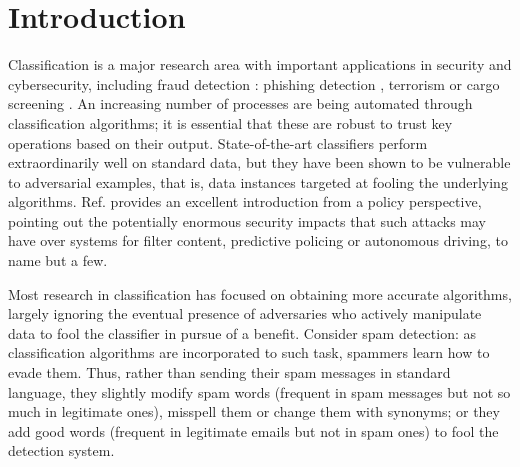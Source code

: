 
\section{Introduction}



Classification is a major research area with important applications  in security and cybersecurity, including fraud detection \cite{bolton2002statistical}: phishing detection \cite{rakesh}, terrorism \cite{terror} or cargo screening \cite{cargo}. An increasing number of processes are being automated through classification algorithms; it is essential that these are robust to trust key operations based on their output. State-of-the-art classifiers perform extraordinarily well on standard data, but they have been shown to be vulnerable to adversarial examples, that is, data instances targeted at fooling the underlying algorithms. Ref. \cite{comiter} provides an excellent introduction from a policy perspective, pointing out the potentially enormous security impacts that such attacks may have over systems for filter content, predictive policing or autonomous driving, to name but a few. 

Most research in classification has focused on obtaining more accurate algorithms, largely ignoring the eventual presence of adversaries who actively manipulate data to fool the classifier in pursue of a benefit. Consider 
spam detection: as classification algorithms are incorporated to such task,
spammers learn how to evade them. Thus, rather than sending their spam messages in standard language, they 
 slightly modify spam words (frequent in spam messages but not 
so much in legitimate ones), misspell them or 
change them with synonyms; or they add good words (frequent in legitimate emails but not in spam ones) to fool the detection system. %

